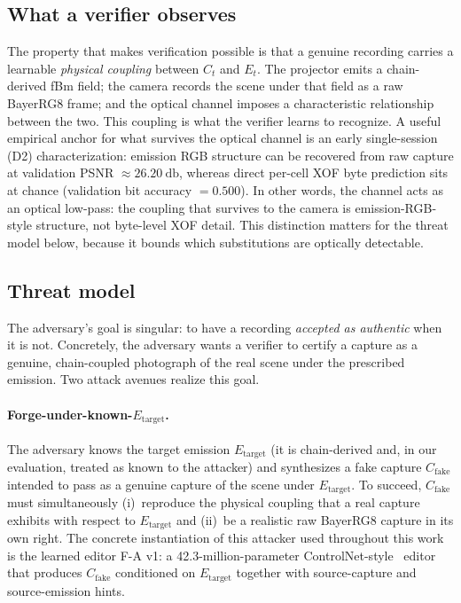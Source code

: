 \subsection{What a verifier observes}
\label{sec:system_threat:observable}

The property that makes verification possible is that a genuine recording carries a learnable \emph{physical coupling} between $C_t$ and $E_t$. The projector emits a chain-derived fBm field; the camera records the scene under that field as a raw BayerRG8 frame; and the optical channel imposes a characteristic relationship between the two. This coupling is what the verifier learns to recognize. A useful empirical anchor for what survives the optical channel is an early single-session (D2) characterization: emission RGB structure can be recovered from raw capture at validation PSNR $\approx \SI{26.20}{\decibel}$, whereas direct per-cell XOF byte prediction sits at chance (validation bit accuracy $=0.500$). In other words, the channel acts as an optical low-pass: the coupling that survives to the camera is emission-RGB-style structure, not byte-level XOF detail. This distinction matters for the threat model below, because it bounds which substitutions are optically detectable.

\subsection{Threat model}
\label{sec:system_threat:threat}

The adversary's goal is singular: to have a recording \emph{accepted as authentic} when it is not. Concretely, the adversary wants a verifier to certify a capture as a genuine, chain-coupled photograph of the real scene under the prescribed emission. Two attack avenues realize this goal.

\paragraph{Forge-under-known-$E_{\mathrm{target}}$.} The adversary knows the target emission $E_{\mathrm{target}}$ (it is chain-derived and, in our evaluation, treated as known to the attacker) and synthesizes a fake capture $C_{\mathrm{fake}}$ intended to pass as a genuine capture of the scene under $E_{\mathrm{target}}$. To succeed, $C_{\mathrm{fake}}$ must simultaneously (i)~reproduce the physical coupling that a real capture exhibits with respect to $E_{\mathrm{target}}$ and (ii)~be a realistic raw BayerRG8 capture in its own right. The concrete instantiation of this attacker used throughout this work is the learned editor F-A v1: a \num{42.3}-million-parameter ControlNet-style~\cite{zhang2023controlnet} editor that produces $C_{\mathrm{fake}}$ conditioned on $E_{\mathrm{target}}$ together with source-capture and source-emission hints.

